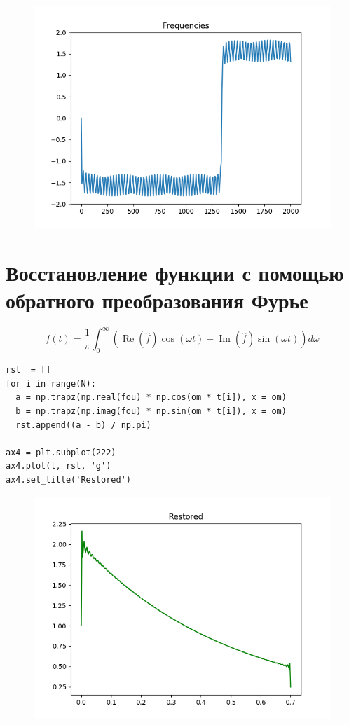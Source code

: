 \documentclass[12pt]{article}
\begin{document}
\begin{figure}[!htb]
\centering
\includegraphics[scale=1.00]{frequencies.png}
\caption{}
\label{}
\end{figure}

\section{Восстановление функции с помощью обратного преобразования Фурье}

\[f(t) = \frac{1}{\pi} \int_{0}^{\infty}(\operatorname{Re}(\hat{f})\cos(\omega t) - \operatorname{Im}(\hat{f})\sin(\omega t))d\omega \]

\begin{lstlisting}
rst  = []
for i in range(N):
  a = np.trapz(np.real(fou) * np.cos(om * t[i]), x = om)
  b = np.trapz(np.imag(fou) * np.sin(om * t[i]), x = om)
  rst.append((a - b) / np.pi)

ax4 = plt.subplot(222)
ax4.plot(t, rst, 'g')
ax4.set_title('Restored')
\end{lstlisting}

\begin{figure}[htp]
\centering
\includegraphics[scale=1.00]{restored.png}
\caption{}
\label{}
\end{figure}
\end{document}
